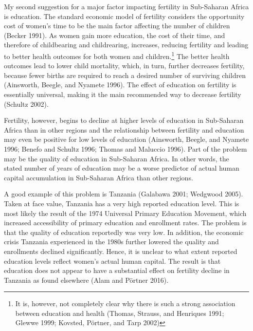 \documentclass[]{article}
\begin{document}
My second suggestion for a major factor impacting fertility in Sub-Saharan Africa is education. The standard economic model of fertility considers the opportunity cost of women's time to be the main factor affecting the number of children (Becker 1991). As women gain more education, the cost of their time, and therefore of childbearing and childrearing, increases, reducing fertility and leading to better health outcomes for both women and children.\footnote{It is, however, not completely clear why there is such a strong association between education and health (Thomas, Strauss, and Henriques 1991; Glewwe 1999; Kovsted, Pörtner, and Tarp 2002)} The better health outcomes lead to lower child mortality, which, in turn, further decreases fertility, because fewer births are required to reach a desired number of surviving children (Ainsworth, Beegle, and Nyamete 1996). The effect of education on fertility is essentially universal, making it the main recommended way to decrease fertility (Schultz 2002).

Fertility, however, begins to decline at higher levels of education in Sub-Saharan Africa than in other regions and the relationship between fertility and education may even be positive for low levels of education (Ainsworth, Beegle, and Nyamete 1996; Benefo and Schultz 1996; Thomas and Maluccio 1996). Part of the problem may be the quality of education in Sub-Saharan Africa. In other words, the stated number of years of education may be a worse predictor of actual human capital accumulation in Sub-Saharan Africa than other regions.

A good example of this problem is Tanzania (Galabawa 2001; Wedgwood 2005). Taken at face value, Tanzania has a very high reported education level. This is most likely the result of the 1974 Universal Primary Education Movement, which increased accessibility of primary education and enrollment rates. The problem is that the quality of education reportedly was very low. In addition, the economic crisis Tanzania experienced in the 1980s further lowered the quality and enrollments declined significantly. Hence, it is unclear to what extent reported education levels reflect women's actual human capital. The result is that education does not appear to have a substantial effect on fertility decline in Tanzania as found elsewhere (Alam and Pörtner 2016).
\end{document}
